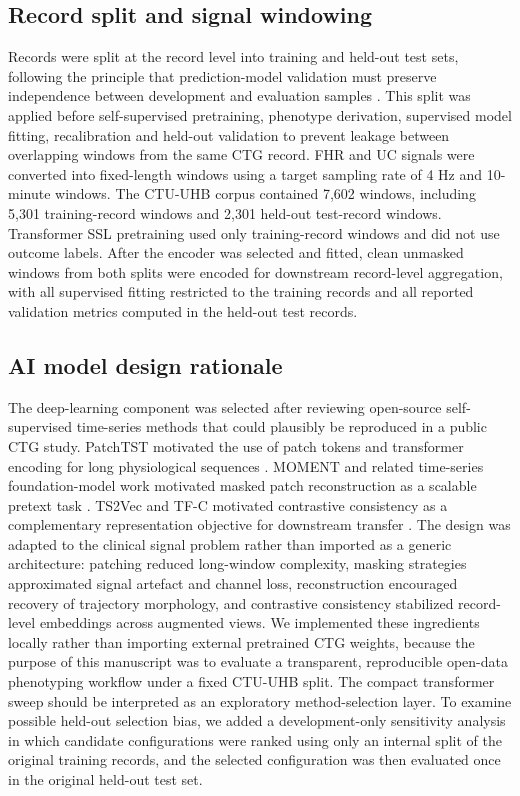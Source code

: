 \documentclass[utf8]{FrontiersinHarvard}
\begin{document}
\subsection{Record split and signal windowing}

Records were split at the record level into training and held-out test sets, following the principle that prediction-model validation must preserve independence between development and evaluation samples \citep{tripod2015,steyerberg2019,tripodai2024}. This split was applied before self-supervised pretraining, phenotype derivation, supervised model fitting, recalibration and held-out validation to prevent leakage between overlapping windows from the same CTG record. FHR and UC signals were converted into fixed-length windows using a target sampling rate of 4 Hz and 10-minute windows. The CTU-UHB corpus contained 7,602 windows, including 5,301 training-record windows and 2,301 held-out test-record windows. Transformer SSL pretraining used only training-record windows and did not use outcome labels. After the encoder was selected and fitted, clean unmasked windows from both splits were encoded for downstream record-level aggregation, with all supervised fitting restricted to the training records and all reported validation metrics computed in the held-out test records.

\subsection{AI model design rationale}

The deep-learning component was selected after reviewing open-source self-supervised time-series methods that could plausibly be reproduced in a public CTG study. PatchTST motivated the use of patch tokens and transformer encoding for long physiological sequences \citep{nie2023}. MOMENT and related time-series foundation-model work motivated masked patch reconstruction as a scalable pretext task \citep{goswami2024moment}. TS2Vec and TF-C motivated contrastive consistency as a complementary representation objective for downstream transfer \citep{yue2022,zhang2022tfc}. The design was adapted to the clinical signal problem rather than imported as a generic architecture: patching reduced long-window complexity, masking strategies approximated signal artefact and channel loss, reconstruction encouraged recovery of trajectory morphology, and contrastive consistency stabilized record-level embeddings across augmented views. We implemented these ingredients locally rather than importing external pretrained CTG weights, because the purpose of this manuscript was to evaluate a transparent, reproducible open-data phenotyping workflow under a fixed CTU-UHB split. The compact transformer sweep should be interpreted as an exploratory method-selection layer. To examine possible held-out selection bias, we added a development-only sensitivity analysis in which candidate configurations were ranked using only an internal split of the original training records, and the selected configuration was then evaluated once in the original held-out test set.
\end{document}
